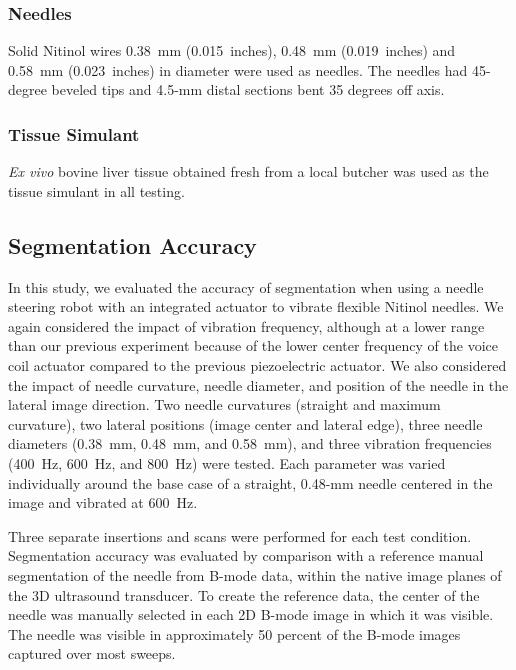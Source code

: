 \subsubsection{Needles}
Solid Nitinol wires 0.38~mm (0.015~inches), 0.48~mm (0.019~inches) and 0.58~mm (0.023~inches) in diameter were used as needles. The needles had 45-degree beveled tips and 4.5-mm distal sections bent 35 degrees off axis.

\subsubsection{Tissue Simulant}
\textit{Ex vivo} bovine liver tissue obtained fresh from a local butcher was used as the tissue simulant in all testing.

\subsection{Segmentation Accuracy}
In this study, we evaluated the accuracy of segmentation when using a needle steering robot with an integrated actuator to vibrate flexible Nitinol needles. We again considered the impact of vibration frequency, although at a lower range than our previous experiment because of the lower center frequency of the voice coil actuator compared to the previous piezoelectric actuator. We also considered the impact of needle curvature, needle diameter, and position of the needle in the lateral image direction. Two needle curvatures (straight and maximum curvature), two lateral positions (image center and lateral edge), three needle diameters (0.38~mm, 0.48~mm, and 0.58~mm), and three vibration frequencies (400~Hz, 600~Hz, and 800~Hz) were tested. Each parameter was varied individually around the base case of a straight, 0.48-mm needle centered in the image and vibrated at 600~Hz. 

Three separate insertions and scans were performed for each test condition. Segmentation accuracy was evaluated by comparison with a reference manual segmentation of the needle from B-mode data, within the native image planes of the 3D ultrasound transducer. To create the reference data, the center of the needle was manually selected in each 2D B-mode image in which it was visible. The needle was visible in approximately 50 percent of the B-mode images captured over most sweeps. 

